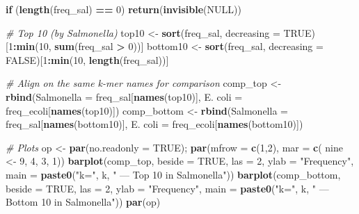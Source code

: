 \documentclass[
]{article}
\newenvironment{Shaded}{\begin{snugshade}}{\end{snugshade}}
\newcommand{\AttributeTok}[1]{\textcolor[rgb]{0.13,0.29,0.53}{#1}}
\newcommand{\CommentTok}[1]{\textcolor[rgb]{0.56,0.35,0.01}{\textit{#1}}}
\newcommand{\ConstantTok}[1]{\textcolor[rgb]{0.56,0.35,0.01}{#1}}
\newcommand{\ControlFlowTok}[1]{\textcolor[rgb]{0.13,0.29,0.53}{\textbf{#1}}}
\newcommand{\DecValTok}[1]{\textcolor[rgb]{0.00,0.00,0.81}{#1}}
\newcommand{\FunctionTok}[1]{\textcolor[rgb]{0.13,0.29,0.53}{\textbf{#1}}}
\newcommand{\NormalTok}[1]{#1}
\newcommand{\OtherTok}[1]{\textcolor[rgb]{0.56,0.35,0.01}{#1}}
\newcommand{\SpecialCharTok}[1]{\textcolor[rgb]{0.81,0.36,0.00}{\textbf{#1}}}
\newcommand{\StringTok}[1]{\textcolor[rgb]{0.31,0.60,0.02}{#1}}
\begin{document}
\begin{Shaded}
\begin{Highlighting}[]
  \ControlFlowTok{if}\NormalTok{ (}\FunctionTok{length}\NormalTok{(freq\_sal) }\SpecialCharTok{==} \DecValTok{0}\NormalTok{) }\FunctionTok{return}\NormalTok{(}\FunctionTok{invisible}\NormalTok{(}\ConstantTok{NULL}\NormalTok{))}

  \CommentTok{\# Top 10 (by Salmonella)}
\NormalTok{  top10    }\OtherTok{\textless{}{-}} \FunctionTok{sort}\NormalTok{(freq\_sal, }\AttributeTok{decreasing =} \ConstantTok{TRUE}\NormalTok{)[}\DecValTok{1}\SpecialCharTok{:}\FunctionTok{min}\NormalTok{(}\DecValTok{10}\NormalTok{, }\FunctionTok{sum}\NormalTok{(freq\_sal }\SpecialCharTok{\textgreater{}} \DecValTok{0}\NormalTok{))]}
\NormalTok{  bottom10 }\OtherTok{\textless{}{-}} \FunctionTok{sort}\NormalTok{(freq\_sal, }\AttributeTok{decreasing =} \ConstantTok{FALSE}\NormalTok{)[}\DecValTok{1}\SpecialCharTok{:}\FunctionTok{min}\NormalTok{(}\DecValTok{10}\NormalTok{, }\FunctionTok{length}\NormalTok{(freq\_sal))]}

  \CommentTok{\# Align on the same k{-}mer names for comparison}
\NormalTok{  comp\_top }\OtherTok{\textless{}{-}} \FunctionTok{rbind}\NormalTok{(}\AttributeTok{Salmonella =}\NormalTok{ freq\_sal[}\FunctionTok{names}\NormalTok{(top10)],}
                    \StringTok{\textasciigrave{}}\AttributeTok{E. coli}\StringTok{\textasciigrave{}}  \OtherTok{=}\NormalTok{ freq\_ecoli[}\FunctionTok{names}\NormalTok{(top10)])}
\NormalTok{  comp\_bottom }\OtherTok{\textless{}{-}} \FunctionTok{rbind}\NormalTok{(}\AttributeTok{Salmonella =}\NormalTok{ freq\_sal[}\FunctionTok{names}\NormalTok{(bottom10)],}
                       \StringTok{\textasciigrave{}}\AttributeTok{E. coli}\StringTok{\textasciigrave{}}  \OtherTok{=}\NormalTok{ freq\_ecoli[}\FunctionTok{names}\NormalTok{(bottom10)])}

  \CommentTok{\# Plots}
\NormalTok{  op }\OtherTok{\textless{}{-}} \FunctionTok{par}\NormalTok{(}\AttributeTok{no.readonly =} \ConstantTok{TRUE}\NormalTok{); }\FunctionTok{par}\NormalTok{(}\AttributeTok{mfrow =} \FunctionTok{c}\NormalTok{(}\DecValTok{1}\NormalTok{,}\DecValTok{2}\NormalTok{), }\AttributeTok{mar =} \FunctionTok{c}\NormalTok{( nine }\OtherTok{\textless{}{-}} \DecValTok{9}\NormalTok{, }\DecValTok{4}\NormalTok{, }\DecValTok{3}\NormalTok{, }\DecValTok{1}\NormalTok{))}
  \FunctionTok{barplot}\NormalTok{(comp\_top, }\AttributeTok{beside =} \ConstantTok{TRUE}\NormalTok{, }\AttributeTok{las =} \DecValTok{2}\NormalTok{, }\AttributeTok{ylab =} \StringTok{"Frequency"}\NormalTok{,}
          \AttributeTok{main =} \FunctionTok{paste0}\NormalTok{(}\StringTok{"k="}\NormalTok{, k, }\StringTok{" — Top 10 in Salmonella"}\NormalTok{))}
  \FunctionTok{barplot}\NormalTok{(comp\_bottom, }\AttributeTok{beside =} \ConstantTok{TRUE}\NormalTok{, }\AttributeTok{las =} \DecValTok{2}\NormalTok{, }\AttributeTok{ylab =} \StringTok{"Frequency"}\NormalTok{,}
          \AttributeTok{main =} \FunctionTok{paste0}\NormalTok{(}\StringTok{"k="}\NormalTok{, k, }\StringTok{" — Bottom 10 in Salmonella"}\NormalTok{))}
  \FunctionTok{par}\NormalTok{(op)}


\end{Highlighting}
\end{Shaded}
\end{document}
